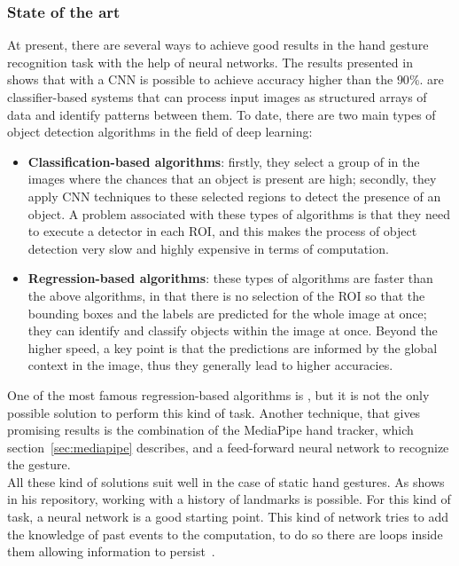 \documentclass[../thesis.tex]{subfiles}
\begin{document}
\subsubsection{State of the art}
At present, there are several ways to achieve good results in the hand gesture recognition task with the help of neural networks. The results presented in~\citeauthor{paper:survey_on_vision_based_hand_gesture_recognition}~\cite{paper:survey_on_vision_based_hand_gesture_recognition} shows that with a \acrfull{CNN} is possible to achieve accuracy higher than the $90\%$.  are classifier-based systems that can process input images as structured arrays of data and identify patterns between them. To date, there are two main types of object detection algorithms in the field of deep learning:
\begin{itemize}
    \item \textbf{Classification-based algorithms}: firstly, they select a group of  in the images where the chances that an object is present are high; secondly, they apply \acrshort{CNN} techniques to these selected regions to detect the presence of an object. A problem associated with these types of algorithms is that they need to execute a detector in each \acrshort{ROI}, and this makes the process of object detection very slow and highly expensive in terms of computation.
    \item \textbf{Regression-based algorithms}: these types of algorithms are faster than the above algorithms, in that there is no selection of the \acrshort{ROI} so that the bounding boxes and the labels are predicted for the whole image at once; they can identify and classify objects within the image at once. Beyond the higher speed, a key point is that the predictions are informed by the global context in the image, thus they generally lead to higher accuracies.
\end{itemize}
One of the most famous regression-based algorithms is , but it is not the only possible solution to perform this kind of task. Another technique, that gives promising results is the combination of the MediaPipe hand tracker, which section~\ref{sec:mediapipe} describes, and a feed-forward neural network to recognize the gesture.\\
All these kind of solutions suit well in the case of static hand gestures. As \citeauthor{site:hand_gesture_base_repo} shows in his repository\cite{site:hand_gesture_base_repo}, working with a history of landmarks is possible. For this kind of task, a  neural network is a good starting point. This kind of network tries to add the knowledge of past events to the computation, to do so there are loops inside them allowing information to persist~\cite{site:understanding_lstm_networks}.
\end{document}
